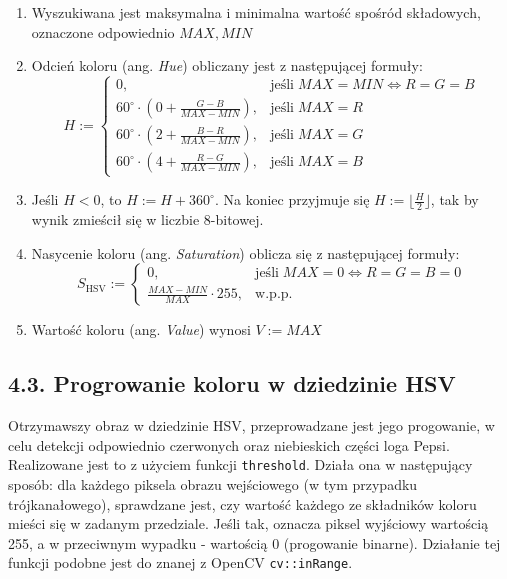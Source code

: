 \documentclass[11pt,a4paper,twoside]{report}
\begin{document}
			\begin{enumerate}
				\item Wyszukiwana jest maksymalna i minimalna wartość spośród składowych, oznaczone odpowiednio $MAX, MIN$
				\item Odcień koloru (ang. \emph{Hue}) obliczany jest z następującej formuły:
					\[
						H := \begin{cases}
						    0, & \text{jeśli}\; MAX = MIN \Leftrightarrow R = G = B \\
						    60^\circ \cdot \left( 0 + \frac {G - B} {MAX - MIN} \right), & \text{jeśli}\; MAX = R \\
						    60^\circ \cdot \left( 2 + \frac {B - R} {MAX - MIN} \right), & \text{jeśli}\; MAX = G \\
						    60^\circ \cdot \left( 4 + \frac {R - G} {MAX - MIN} \right), & \text{jeśli}\; MAX = B
						   \end{cases}
					\]
				\item Jeśli $H < 0$, to $H := H + 360^\circ$. Na koniec przyjmuje się $H := \lfloor \frac{H}{2} \rfloor$, tak by wynik zmieścił się w liczbie 8-bitowej.
				\item Nasycenie koloru (ang. \emph{Saturation}) oblicza się z następującej formuły:
					\[
						S_{\mathrm {HSV} }:={\begin{cases}0,&{\text{jeśli}}\;MAX=0\Leftrightarrow R=G=B=0\\{\frac {MAX-MIN}{MAX} \cdot 255},&{\text{w.p.p.}}\end{cases}}
					\]
				\item Wartość koloru (ang. \emph{Value}) wynosi $V := MAX$
			\end{enumerate}

	\subsection*{4.3. Progrowanie koloru w dziedzinie HSV}

			Otrzymawszy obraz w dziedzinie HSV, przeprowadzane jest jego progowanie, w celu detekcji odpowiednio czerwonych oraz niebieskich części loga Pepsi. Realizowane jest to z użyciem funkcji \texttt{threshold}. Działa ona w następujący sposób: dla każdego piksela obrazu wejściowego (w tym przypadku trójkanałowego), sprawdzane jest, czy wartość każdego ze składników koloru mieści się w zadanym przedziale. Jeśli tak, oznacza piksel wyjściowy wartością 255, a w przeciwnym wypadku - wartością 0 (progowanie binarne). Działanie tej funkcji podobne jest do znanej z OpenCV \texttt{cv::inRange}.
\end{document}
